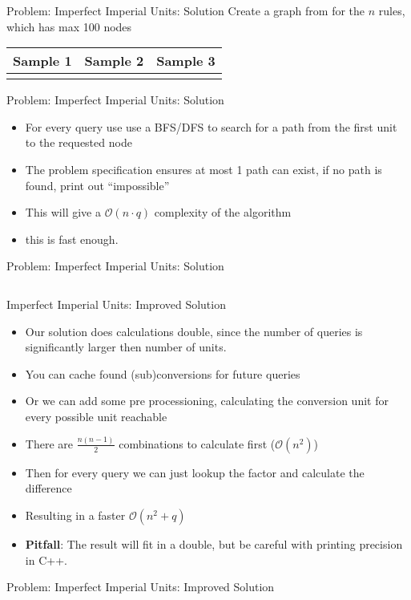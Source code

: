 \documentclass[11pt,pdf, aspectratio=169]{beamer}
\begin{document}
  \begin{frame}{Problem: Imperfect Imperial Units: Solution}
    Create a graph from for the $n$ rules, which has max 100 nodes


    \begin{tabular}{c|c|c}
      Sample 1               & Sample 2               & Sample 3               \\
      \hline
       &  &  \\
    \end{tabular}
  \end{frame}

  \begin{frame}{Problem: Imperfect Imperial Units: Solution}
    \begin{itemize}
      \item For every query use use a BFS/DFS to search for a path from the first unit to the requested node
      \item The problem specification ensures at most 1 path can exist, if no path is found, print out ``impossible''
      \item This will give a $\mathcal{O}(n\cdot q)$ complexity of the algorithm
      \item this is fast enough.
    \end{itemize}
  \end{frame}
  \begin{frame}[containsverbatim]{ Problem: Imperfect Imperial Units: Solution}
    \inputminted[fontsize=\tiny]{python}{code/session-1/python/bapc-i-search.py}
  \end{frame}
  \begin{frame}{Imperfect Imperial Units: Improved Solution}
    \begin{itemize}
      \item<1-> Our solution does calculations double, since the number of queries is significantly larger then number of units.
      \item<2-> You can cache found (sub)conversions for future queries
      \item<3-> Or we can add some pre processioning, calculating the conversion unit for every possible unit reachable
      \item<3-> There are $\frac{n(n-1)}{2}$ combinations to calculate first ($\mathcal{O}(n^2)$)
      \item<3-> Then for every query we can just lookup the factor and calculate the difference
      \item<4-> Resulting in a faster $\mathcal{O}(n^2 + q)$
      \item<5-> \textbf{Pitfall}: The result will fit in a double, but be careful with printing precision in C++.
    \end{itemize}
  \end{frame}
  \begin{frame}[containsverbatim]{ Problem: Imperfect Imperial Units: Improved Solution}
    \inputminted[fontsize=\tiny]{python}{code/session-1/python/bapc-i-cache.py}
  \end{frame}
\end{document}
